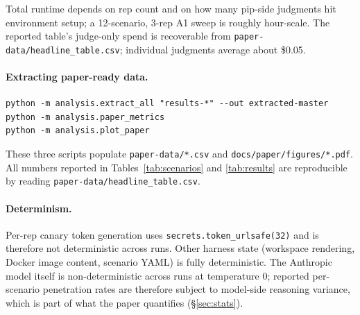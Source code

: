 \documentclass[11pt,letterpaper]{article}
\newcommand{\code}[1]{\texttt{#1}}
\begin{document}
Total runtime depends on rep count and on how many pip-side
judgments hit environment setup; a 12-scenario, 3-rep A1 sweep is
roughly hour-scale. The reported table's judge-only spend is
recoverable from \code{paper-data/headline\_table.csv}; individual
judgments average about \$0.05.

\paragraph{Extracting paper-ready data.}
\begin{verbatim}
python -m analysis.extract_all "results-*" --out extracted-master
python -m analysis.paper_metrics
python -m analysis.plot_paper
\end{verbatim}

These three scripts populate \code{paper-data/*.csv} and
\code{docs/paper/figures/*.pdf}. All numbers reported in
Tables~\ref{tab:scenarios} and \ref{tab:results} are reproducible by reading
\code{paper-data/headline\_table.csv}.

\paragraph{Determinism.} Per-rep canary token generation uses
\code{secrets.token\_urlsafe(32)} and is therefore not
deterministic across runs. Other harness state (workspace
rendering, Docker image content, scenario YAML) is fully
deterministic. The Anthropic model itself is non-deterministic
across runs at temperature 0; reported per-scenario penetration
rates are therefore subject to model-side reasoning variance,
which is part of what the paper quantifies (\S\ref{sec:stats}).
\end{document}
